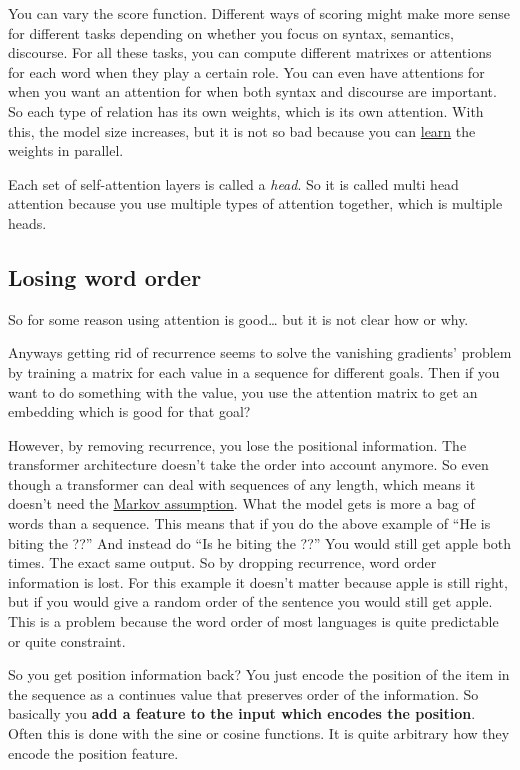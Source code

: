 \documentclass[
  11pt,
  british,
]{article}
\begin{document}
You can vary the score function. Different ways of scoring might make
more sense for different tasks depending on whether you focus on syntax,
semantics, discourse. For all these tasks, you can compute different
matrixes or attentions for each word when they play a certain role. You
can even have attentions for when you want an attention for when both
syntax and discourse are important. So each type of relation has its own
weights, which is its own attention. With this, the model size
increases, but it is not so bad because you can
\href{../Other/Learning.md}{learn} the weights in parallel.

Each set of self-attention layers is called a \emph{head}. So it is
called multi head attention because you use multiple types of attention
together, which is multiple heads.

\hypertarget{losing-word-order}{%
\subsection{Losing word order}\label{losing-word-order}}

So for some reason using attention is good\ldots{} but it is not clear
how or why.

Anyways getting rid of recurrence seems to solve the vanishing
gradients' problem by training a matrix for each value in a sequence for
different goals. Then if you want to do something with the value, you
use the attention matrix to get an embedding which is good for that
goal?

However, by removing recurrence, you lose the positional information.
The transformer architecture doesn't take the order into account
anymore. So even though a transformer can deal with sequences of any
length, which means it doesn't need the
\href{Markov\%20assumption.md}{Markov assumption}. What the model gets
is more a bag of words than a sequence. This means that if you do the
above example of ``He is biting the ??'' And instead do ``Is he biting
the ??'' You would still get apple both times. The exact same output. So
by dropping recurrence, word order information is lost. For this example
it doesn't matter because apple is still right, but if you would give a
random order of the sentence you would still get apple. This is a
problem because the word order of most languages is quite predictable or
quite constraint.

So you get position information back? You just encode the position of
the item in the sequence as a continues value that preserves order of
the information. So basically you \textbf{add a feature to the input
which encodes the position}. Often this is done with the sine or cosine
functions. It is quite arbitrary how they encode the position feature.
\end{document}
